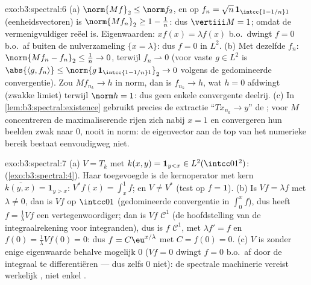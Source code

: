 \begin{solution}{exo:b3:spectral:6}
(a) $\norm{Mf}_2 \leq \norm f_2$, en op $f_n = \sqrt n\, \mathbf
1_{\intcc{1 - 1/n}1}$ (eenheidsvectoren) is $\norm{Mf_n}_2 \geq 1
- \frac1n$: dus $\vertiii M = 1$;  omdat de
vermenigvuldiger reëel is. Eigenwaarden: $xf(x) = \lambda f(x)$
b.o.\ dwingt $f = 0$ b.o.\ af buiten de nulverzameling $\{x =
\lambda\}$: dus $f = 0$ in $L^2$.
(b) Met dezelfde $f_n$: $\norm{Mf_n - f_n}_2 \leq \frac1n \to 0$,
terwijl $f_n \rightharpoonup 0$ (voor vaste $g \in L^2$ is
$\abs{\langle g, f_n\rangle} \leq \norm{g\,\mathbf
1_{\intcc{1-1/n}1}}_2 \to 0$ volgens de gedomineerde
convergentie). Zou $Mf_{n_k} \to h$ in norm, dan is $f_{n_k} \to
h$, wat $h = 0$ afdwingt (zwakke limiet) terwijl $\norm h = 1$:
dus geen enkele convergente deelrij.
(c) In \cref{lem:b3:spectral:existence} gebruikt precies de
extractie ``$Tx_{n_k} \to y$'' de ; voor $M$
concentreren de maximaliserende rijen zich nabij $x = 1$ en
convergeren hun beelden zwak naar $0$, nooit in norm: de
eigenvector aan de top van het numerieke bereik bestaat
eenvoudigweg niet.
\end{solution}

\begin{solution}{exo:b3:spectral:7}
(a) $V = T_k$ met $k(x, y) = \mathbf 1_{y < x} \in
L^2(\intcc01^2)$:  (\cref{exo:b3:spectral:4}). Haar
toegevoegde is de kernoperator met kern $\overline{k(y, x)} =
\mathbf 1_{y > x}$: $V^*f(x) = \int_x^1f$; en $V \neq V^*$ (test
op $f = \mathbf 1$).
(b) Is $Vf = \lambda f$ met $\lambda \ne 0$, dan is $Vf$ 
op $\intcc01$ (gedomineerde convergentie in $\int_0^x f$), dus
heeft $f = \frac1\lambda Vf$ een  vertegenwoordiger; dan
is $Vf$ $\mathcal C^1$ (de hoofdstelling van de
integraalrekening voor  integranden), dus is $f$
$\mathcal C^1$, met $\lambda f' = f$ en $f(0) = \frac1\lambda
Vf(0) = 0$: dus $f = C\eu^{x/\lambda}$ met $C = f(0) = 0$.
(c) $V$ is  zonder enige eigenwaarde behalve mogelijk $0$
($Vf = 0$ dwingt $f = 0$ b.o.\ af door de integraal te
differentiëren --- dus zelfs $0$ niet): de spectrale machinerie
vereist werkelijk , niet enkel .
\end{solution}

